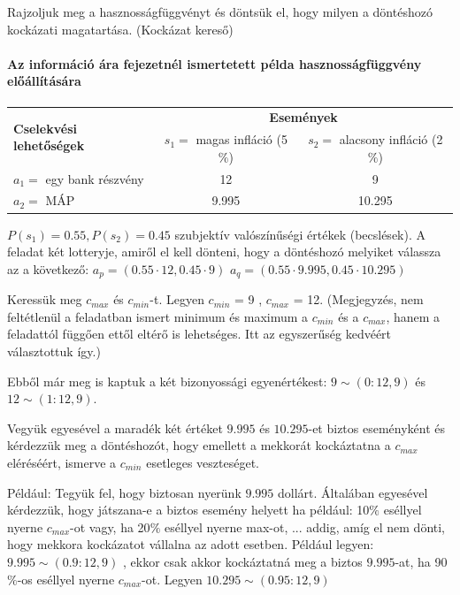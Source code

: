 \documentclass[a4paper,12pt]{article}
\begin{document}
Rajzoljuk meg a hasznosságfüggvényt és döntsük el, hogy milyen a döntéshozó kockázati magatartása. (Kockázat kereső)

\paragraph{Az információ ára fejezetnél ismertetett példa hasznosságfüggvény előállítására}

\begin{center}
\begin{tabular}{l|c|c}
\multirow{2}{*}{\bf Cselekvési lehetőségek } &  \multicolumn{2}{c}{ \bf Események }\\
 & $s_1=$ magas infláció (5$\%$) & $s_2=$ alacsony infláció (2$\%$) \\
\hline
  $a_1=$ egy bank részvény & 12 & 9 \\
  $a_2=$ MÁP & 9.995 & 10.295 \\
\end{tabular}
\end{center}
$P(s_1) = 0.55 , P(s_2) = 0.45$ szubjektív valószínűségi értékek (becslések).
A feladat két lotteryje, amiről el kell dönteni, hogy a döntéshozó melyiket válassza az a következő:
$a_p = ( 0.55 \cdot 12 , 0.45 \cdot 9 ) $
$a_q = ( 0.55 \cdot 9.995 , 0.45 \cdot 10.295 ) $

Keressük meg $c_{max}$ és $c_{min}$-t. Legyen $c_{min}$ = 9 , $c_{max}$ = 12. (Megjegyzés, nem feltétlenül a feladatban ismert minimum és maximum a $c_{min}$ és a $c_{max}$, hanem a feladattól függően ettől eltérő is lehetséges. Itt az egyszerűség kedvéért választottuk így.)

Ebből már meg is kaptuk a két bizonyossági egyenértékest: $9 \sim (0: 12,9)$ és $12 \sim (1: 12,9)$.

Vegyük egyesével a maradék két értéket $9.995$ és $10.295$-et biztos eseményként és kérdezzük meg a döntéshozót, hogy emellett a mekkorát kockáztatna a $c_{max}$ eléréséért, ismerve a $c_{min}$ esetleges veszteséget.

Például: Tegyük fel, hogy biztosan nyerünk $9.995$ dollárt. Általában egyesével kérdezzük, hogy játszana-e a biztos esemény helyett ha például: 10$\%$ eséllyel nyerne $c_{max}$-ot vagy, ha 20$\%$ eséllyel nyerne max-ot, ... addig, amíg el nem dönti, hogy mekkora kockázatot vállalna az adott esetben. Például legyen: $9.995 \sim (0.9: 12,9)$ , ekkor csak akkor kockáztatná meg a biztos $9.995$-at, ha 90$\%$-os eséllyel nyerne $c_{max}$-ot. Legyen $10.295 \sim (0.95: 12,9)$ 
\end{document}
